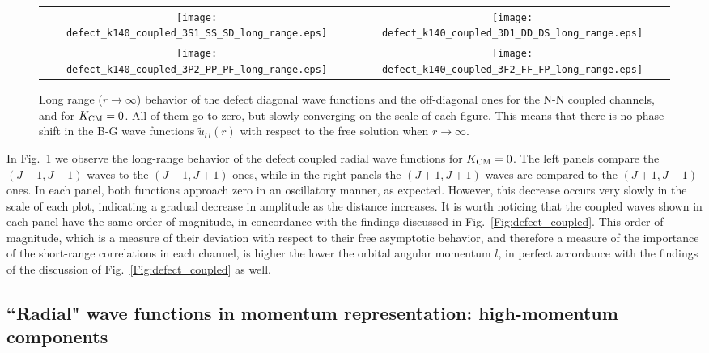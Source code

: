 \documentclass[aps,twocolumn,showpacs,preprintnumbers,amsmath,amssymb,nofootinbib,superscriptaddress,showkeys,noeprint]{revtex4-1}
\begin{document}
\begin{figure*}[!ht]
\begin{tabular}{cc}
\texttt{[image: defect\_k140\_coupled\_3S1\_SS\_SD\_long\_range.eps]}&
\texttt{[image: defect\_k140\_coupled\_3D1\_DD\_DS\_long\_range.eps]}\\
\texttt{[image: defect\_k140\_coupled\_3P2\_PP\_PF\_long\_range.eps]}&
\texttt{[image: defect\_k140\_coupled\_3F2\_FF\_FP\_long\_range.eps]}\\
\end{tabular}
\caption{Long range ($r\rightarrow\infty$) behavior of the defect
  diagonal wave functions and the off-diagonal ones for the N-N
  coupled channels, and for $K_{\rm CM}=0$.  All of them go to zero,
  but slowly converging on the scale of each figure.  This means that
  there is no phase-shift in the B-G wave functions
  $\widetilde{u}_{l\,l}(r)$ with respect to the free solution when
  $r\rightarrow\infty$.}
\label{Fig:long_range_behaviour}
\end{figure*}


In Fig.~\ref{Fig:long_range_behaviour} we observe the long-range
behavior of the defect coupled radial wave functions for $K_{\rm
  CM}=0$.  The left panels compare the $(J-1,J-1)$ waves to the
$(J-1,J+1)$ ones, while in the right panels the $(J+1,J+1)$ waves are
compared to the $(J+1,J-1)$ ones. In each panel, both functions
approach zero in an oscillatory manner, as expected. However, this
decrease occurs very slowly in the scale of each plot, indicating a
gradual decrease in amplitude as the distance increases. It is worth
noticing that the coupled waves shown in each panel have the same
order of magnitude, in concordance with the findings discussed in
Fig.~\ref{Fig:defect_coupled}.  This order of magnitude, which is a
measure of their deviation with respect to their free asymptotic
behavior, and therefore a measure of the importance of the short-range
correlations in each channel, is higher the lower the orbital angular
momentum $l$, in perfect accordance with the findings of the
discussion of Fig.~\ref{Fig:defect_coupled} as well.

\subsection{``Radial" wave functions in momentum 
representation: high-momentum components}
\label{subsec:radial_wf_momentum}
\end{document}
